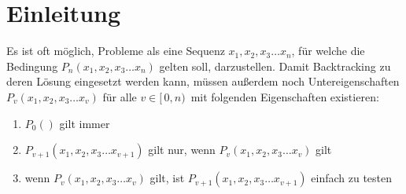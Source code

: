 \chapter{Einleitung}\label{einleitung}
Es ist oft möglich, Probleme als eine Sequenz $x_{1}, x_{2}, x_{3} \dots x_{n}$, für 
welche die Bedingung $P_{n}(x_{1}, x_{2}, x_{3} \dots x_{n})$ gelten soll, darzustellen.
Damit Backtracking zu deren Lösung eingesetzt werden kann, müssen außerdem noch
Untereigenschaften $P_{v}(x_{1}, x_{2}, x_{3} \dots x_{v})$ für alle $v \in [ \, 0, n) \,$ 
mit folgenden Eigenschaften existieren:
\begin{enumerate}
  \item $P_{0}()$ gilt immer
  \item $P_{v + 1}(x_{1}, x_{2}, x_{3} \dots x_{v + 1})$ gilt nur, wenn $P_{v}(x_{1}, x_{2}, x_{3} \dots x_{v})$ gilt
  \item wenn $P_{v}(x_{1}, x_{2}, x_{3} \dots x_{v})$ gilt, ist $P_{v + 1}(x_{1}, x_{2}, x_{3} \dots x_{v+1})$ einfach zu testen
\end{enumerate}


